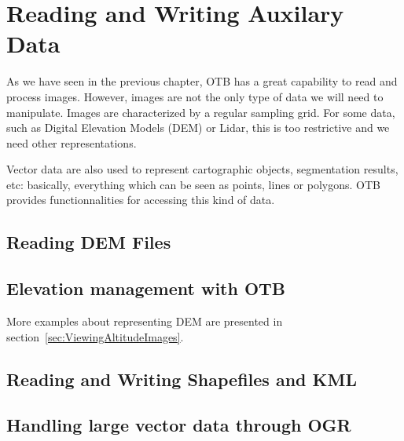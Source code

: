 \chapter{Reading and Writing Auxilary Data}
\label{sec:ReadingAuxData}

As we have seen in the previous chapter, OTB has a great capability to
read and process images. However, images are not the only type of data
we will need to manipulate. Images are characterized by a regular
sampling grid. For some data, such as Digital Elevation Models (DEM)
or Lidar, this is too restrictive and we need other representations.

Vector data are also used to represent cartographic objects,
segmentation results, etc: basically, everything which can be seen as
points, lines or polygons. OTB provides functionnalities for accessing
this kind of data.

\section{Reading DEM Files}
\label{sec:ReadDEM}


\section{Elevation management with OTB}
\ifitkFullVersion
\label{sec:DEMHandler}
\fi


More examples about representing DEM are presented in section~\ref{sec:ViewingAltitudeImages}.

\section{Reading and Writing Shapefiles and KML}
\label{sec:ReadVectorData}


\section{Handling large vector data through OGR}
\label{sec:OGRWrappers}


% 
